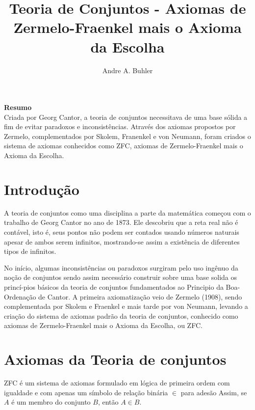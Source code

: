 \documentclass[12pt,a4paper]{article}
\title{Teoria de Conjuntos - Axiomas de Zermelo-Fraenkel mais o Axioma da Escolha}
\author{Andre A. Buhler}
\affil{ Matem\'atica Industrial - UFPR}
\date{}
\begin{document}
\maketitle
    {\bf Resumo}\\
    Criada por Georg Cantor, a teoria de conjuntos necessitava de uma base sólida a fim de evitar paradoxos e inconsistências. Através dos axiomas propostos por Zermelo, complementados por Skolem, Franenkel e von Neumann, foram criados o sistema de axiomas conhecidos como ZFC, axiomas de Zermelo-Fraenkel mais o Axioma da Escolha.
    
  
    \section{Introdução}
        A teoria de conjuntos como uma disciplina a parte da matemática começou com o trabalho de Georg Cantor no ano de 1873. Ele descobriu que a reta real não é contável, isto é, seus pontos não podem ser contados usando números naturais apesar de ambos serem infinitos, mostrando-se assim a existência de diferentes tipos de infinitos.
   
        No início, algumas inconsistências ou paradoxos surgiram pelo uso ingênuo da noção de conjuntos sendo assim necessário construir sobre uma base solida os princí-pios básicos da teoria de conjuntos fundamentados ao Principio da Boa-Ordenação de Cantor. A primeira axiomatização veio de Zermelo (1908), sendo complementada por Skolem e Fraenkel e mais tarde por von Neumann, levando a criação do sistema de axiomas padrão da teoria de conjuntos, conhecido como axiomas de Zermelo-Fraenkel mais o Axioma da Escolha, ou ZFC. 
    
    \section{Axiomas da Teoria de conjuntos}
        ZFC é um sistema de axiomas formulado em lógica de primeira ordem com igualdade e com apenas um símbolo de relação binária $\in$ para adesão%
        Assim, se $A$ é um membro do conjunto $B$, então $A\in B$.
        
\end{document}
